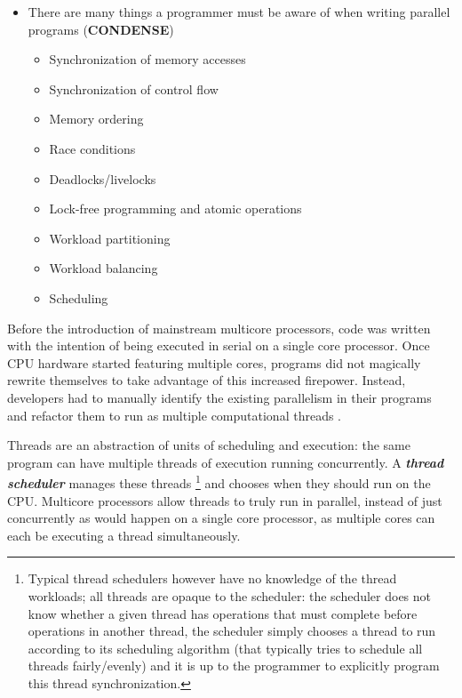 \documentclass[bsc,frontabs,singlespacing,parskip,deptreport,normalheadings]{infthesis}
\begin{document}
\begin{itemize}
    \item There are many things a programmer must be aware of when writing
        parallel programs (\textbf{CONDENSE})
    \begin{itemize}
        \item Synchronization of memory accesses
        \item Synchronization of control flow
        \item Memory ordering
        \item Race conditions
        \item Deadlocks/livelocks
        \item Lock-free programming and atomic operations
        \item Workload partitioning
        \item Workload balancing
        \item Scheduling
    \end{itemize}
\end{itemize}

Before the introduction of mainstream multicore processors, code was written
with the intention of being executed in serial on a single core processor. Once
CPU hardware started featuring multiple cores, programs did not magically
rewrite themselves to take advantage of this increased firepower. Instead,
developers had to manually identify the existing parallelism in their programs
and refactor them to run as multiple computational threads
\cite{patterson_trouble_2010}.

Threads are an abstraction of units of scheduling and execution: the same
program can have multiple threads of execution running concurrently. A
\textit{\textbf{thread scheduler}} manages these threads \footnote{Typical thread
    schedulers however have no knowledge of the thread workloads; all threads
    are opaque to the scheduler: the scheduler does not know whether a given
    thread has operations that must complete before operations in another
    thread, the scheduler simply chooses a thread to run according to its
scheduling algorithm (that typically tries to schedule all threads
fairly/evenly) and it is up to the programmer to explicitly program this thread
synchronization.} and chooses when they should run on the CPU. Multicore
processors allow threads to truly run in parallel, instead of just concurrently
as would happen on a single core processor, as multiple cores can each be
executing a thread simultaneously.
\end{document}

